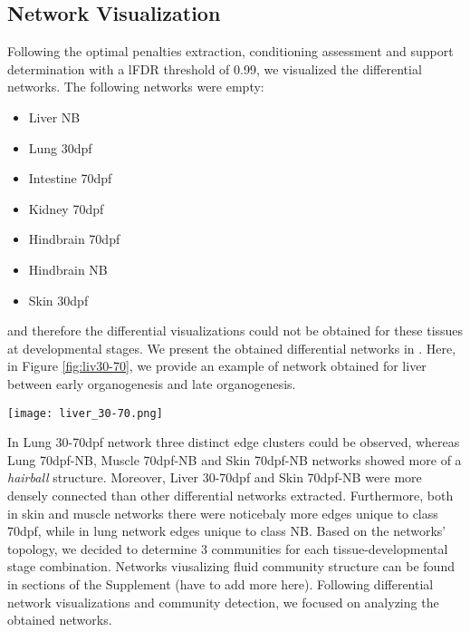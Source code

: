 \documentclass[
	a4paper, %
	10pt, %
	unnumberedsections, %
	twoside, %
]{LTJournalArticle}
\begin{document}
\subsection{\normalsize Network Visualization}\label{netviz}
Following the optimal penalties extraction, conditioning assessment and 
support determination with a lFDR threshold of 0.99, we visualized the differential
networks. The following networks were empty:
\begin{itemize}
    \item Liver NB
    \item Lung 30dpf
    \item Intestine 70dpf
    \item Kidney 70dpf
    \item Hindbrain 70dpf
    \item Hindbrain NB
    \item Skin 30dpf
\end{itemize}
\noindent and therefore the differential visualizations could not be obtained for these 
tissues at developmental stages. We present the obtained differential networks in .
Here, in Figure \ref{fig:liv30-70}, we provide an example of network obtained for liver between early organogenesis 
and late organogenesis.
\clearpage
\begin{figure*}[ht] %
    \centering
    \texttt{[image: liver\_30-70.png]} %
    \caption{Differential network between liver stage 30dpf and liver stage 70dpf. 
	Red nodes indicate up-regulated genes and green down-regulated genes. 
	Edges unique to class liver 30dpf are visualised in pink, while edges 
	unique to class liver 70dpf are in orange. Solid edges correspond to 
	positive partial correlations, whereas dashed edges indicate negatively 
	weighted partial correlations.}
	\label{fig:liv30-70}
\end{figure*}
\clearpage
In Lung 30-70dpf network three distinct edge clusters could be observed, whereas 
Lung 70dpf-NB, Muscle 70dpf-NB and Skin 70dpf-NB networks showed more of a \textit{hairball} 
structure. Moreover, Liver 30-70dpf and Skin 70dpf-NB were more densely connected than other differential networks extracted.
Furthermore, both in skin and muscle networks there were noticebaly more edges unique to class 70dpf,
while in lung network edges unique to class NB. Based on the networks' topology, we decided to determine
3 communities for each tissue-developmental stage combination. Networks viusalizing fluid community structure
can be found in  sections of the Supplement (have to add more here). Following differential network visualizations
and community detection, we focused on analyzing the obtained networks.
\end{document}
